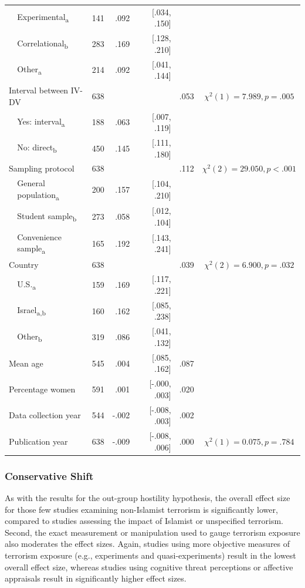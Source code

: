 \begin{ThreePartTable}
\begin{longtable}[c]{llcrrcc}
 & Experimental\textsubscript{a} & 141 & .092 & [.034, .150] &  &  \\
 & Correlational\textsubscript{b} & 283 & .169 & [.128, .210] &  &  \\
 & Other\textsubscript{a} & 214 & .092 & [.041, .144] &  &  \\
\multicolumn{2}{l}{Interval between IV-DV} & 638 &  &  & .053 & $\chi^2(1)=7.989, p=.005$ \\
 & Yes: interval\textsubscript{a} & 188 & .063 & [.007, .119] &  &  \\
 & No: direct\textsubscript{b} & 450 & .145 & [.111, .180] &  &  \\
\multicolumn{2}{l}{Sampling protocol} & 638 &  &  & .112 & $\chi^2(2)=29.050, p<.001$ \\
 & General population\textsubscript{a} & 200 & .157 & [.104, .210] &  &  \\
 & Student sample\textsubscript{b} & 273 & .058 & [.012, .104] &  &  \\
 & Convenience sample\textsubscript{a} & 165 & .192 & [.143, .241] &  &  \\
\multicolumn{2}{l}{Country} & 638 &  &  & .039 & $\chi^2(2)=6.900, p=.032$ \\
 & U.S.\textsubscript{a} & 159 & .169 & [.117, .221] &  &  \\
 & Israel\textsubscript{a,b} & 160 & .162 & [.085, .238] &  &  \\
 & Other\textsubscript{b} & 319 & .086 & [.041, .132] &  &  \\
\multicolumn{2}{l}{Mean age} & 545 & .004 & [.085, .162] & .087 &  \\
\multicolumn{2}{l}{Percentage women} & 591 & .001 & [-.000, .003] & .020 &  \\
\multicolumn{2}{l}{Data collection year} & 544 & -.002 & [-.008, .003] & .002 &  \\
\multicolumn{2}{l}{Publication year} & 638 & -.009 & [-.008, .006] & .000 & $\chi^2(1)=0.075, p=.784$ \\* \bottomrule
\end{longtable}
\end{ThreePartTable}
\newpage

\subsubsection{Conservative Shift}

As with the results for the out-group hostility hypothesis, the overall effect size for those few studies examining non-Islamist terrorism is significantly lower, compared to studies assessing the impact of Islamist or unspecified terrorism. Second, the exact measurement or manipulation used to gauge terrorism exposure also moderates the effect sizes. Again, studies using more objective measures of terrorism exposure (e.g., experiments and quasi-experiments) result in the lowest overall effect size, whereas studies using cognitive threat perceptions or affective appraisals result in significantly higher effect sizes.

